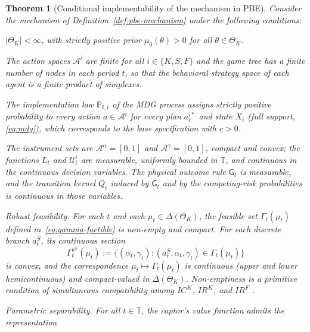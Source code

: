 \documentclass[review,authoryear,12pt]{elsarticle}
\theoremstyle{plain}
\newtheorem{theorem}{Theorem}
\theoremstyle{definition}
\newcommand{\ThetaK}{\Theta_K}
\newcommand{\1}{\mathbf{1}}
\newcommand{\ProbI}[1]{\mathbb{P}_{\mathrm{I},#1}}
\begin{document}
\begin{theorem}[Conditional implementability of the mechanism in PBE]\label{thm:ebp-implementabilidad}
\normalfont
Consider the mechanism of Definition~\ref{def:pbe-mechanism} under the following conditions:
\begin{list}{}{\setlength{\labelwidth}{2.6em}\setlength{\labelsep}{0.7em}\setlength{\leftmargin}{3.3em}\setlength{\itemindent}{0pt}\setlength{\listparindent}{0pt}\setlength{\parsep}{0pt}\setlength{\itemsep}{0.35\baselineskip}}
  \item[\textup{(i)}] $|\ThetaK|<\infty$, with strictly positive prior $\mu_0(\theta)>0$ for all $\theta\in\ThetaK$.
  \item[\textup{(ii)}] The action spaces $\mathcal{A}^i$ are finite for all $i\in\{K,S,F\}$ and the game tree has a finite number of nodes in each period $t$, so that the behavioral strategy space of each agent is a finite product of simplexes.
  \item[\textup{(iii)}] The implementation law $\ProbI{i}$ of the MDG process assigns strictly positive probability to every action $a\in\mathcal{A}^i$ for every plan $a_t^{i\ast}$ and state $X_t$ \textup{(}full support, \eqref{eq:mdg}\textup{)}, which corresponds to the base specification with $\underline{c}>0$.
  \item[\textup{(iv)}] The instrument sets are $\mathcal{A}^{\alpha}=[0,1]$ and $\mathcal{A}^{\gamma}=[0,1]$, compact and convex; the functions $L_t$ and $\mathcal{U}_t^i$ are measurable, uniformly bounded in $\mathbb{T}$, and continuous in the continuous decision variables. The physical outcome rule $\mathsf{G}_t$ is measurable, and the transition kernel $Q_t$ induced by $\mathsf{G}_t$ and by the competing-risk probabilities is continuous in those variables.
  \item[\textup{(v)}] Robust feasibility. For each $t$ and each $\mu_t\in\Delta(\ThetaK)$, the feasible set $\Gamma_t(\mu_t)$ defined in~\eqref{eq:gamma-factible} is non-empty and compact. For each discrete branch $a_t^S$, its continuous section
  \[
  \Gamma_t^{a^S}(\mu_t):=\{(\alpha_t,\gamma_t):(a_t^S,\alpha_t,\gamma_t)\in\Gamma_t(\mu_t)\}
  \]
  is convex, and the correspondence $\mu_t\mapsto\Gamma_t(\mu_t)$ is continuous \textup{(}upper and lower hemicontinuous\textup{)} and compact-valued in $\Delta(\ThetaK)$. Non-emptiness is a primitive condition of simultaneous compatibility among $IC^K$, $IR^K$, and $IR^F$ \citep{KadanRenySwinkels2017}.
  \item[\textup{(vi)}] Parametric separability. For all $t\in\mathbb{T}$, the captor's value function admits the representation

\end{list}
\end{theorem}
\end{document}
